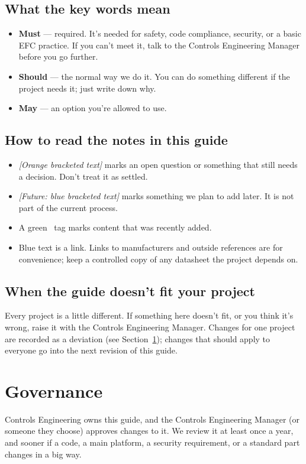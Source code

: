 \subsection*{What the key words mean}
\begin{itemize}[itemsep=2pt]
  \item \textbf{Must} --- required. It's needed for safety, code compliance, security, or a basic EFC practice. If you can't meet it, talk to the Controls Engineering Manager before you go further.
  \item \textbf{Should} --- the normal way we do it. You can do something different if the project needs it; just write down why.
  \item \textbf{May} --- an option you're allowed to use.
\end{itemize}

\subsection*{How to read the notes in this guide}
\begin{itemize}[itemsep=2pt]
  \item \textit{\textcolor{noteorange}{[Orange bracketed text]}} marks an open question or something that still needs a decision. Don't treat it as settled.
  \item \textit{\textcolor{futureblue}{[Future: blue bracketed text]}} marks something we plan to add later. It is not part of the current process.
  \item A green \newtag\ tag marks content that was recently added.
  \item Blue text is a link. Links to manufacturers and outside references are for convenience; keep a controlled copy of any datasheet the project depends on.
\end{itemize}

\subsection*{When the guide doesn't fit your project}
Every project is a little different. If something here doesn't fit, or you think it's wrong, raise it with the Controls Engineering Manager. Changes for one project are recorded as a deviation (see Section~\ref{sec:governance}); changes that should apply to everyone go into the next revision of this guide.

\section{Governance}\label{sec:governance}
Controls Engineering owns this guide, and the Controls Engineering Manager (or someone they choose) approves changes to it. We review it at least once a year, and sooner if a code, a main platform, a security requirement, or a standard part changes in a big way.

